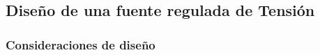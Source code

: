 



\subsection{Diseño de una fuente regulada de Tensión}

\subsubsection{Consideraciones de diseño}

